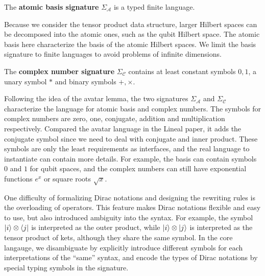 \documentclass[manuscript, review, timestamp]{acmart}
\begin{document}
\begin{definition} 
  The \textbf{atomic basis signature} $\Sigma_\mathcal{A}$ is a  typed finite language.
\end{definition}

Because we consider the tensor product data structure, larger Hilbert spaces can be decomposed into the atomic ones, such as the qubit Hilbert space. The atomic basis here characterize the basis of the atomic Hilbert spaces.
We limit the basis signature to finite languages to avoid problems of infinite dimensions.

\begin{definition} 
  The \textbf{complex number signature} $\Sigma_\mathcal{C}$ contains at least constant symbols $0, 1$, a unary symbol $*$ and binary symbols $+, \times$.
\end{definition}

Following the idea of the avatar lemma, the two signatures $\Sigma_\mathcal{A}$ and $\Sigma_\mathcal{C}$ characterize the language for atomic basis and complex numbers. 
The symbols for complex numbers are zero, one, conjugate, addition and multiplication respectively. Compared the avatar language in the Lineal paper\cite{Arrighi2017}, it adds the conjugate symbol since we need to deal with conjugate and inner product.
These symbols are only the least requirements as interfaces, and the real language to instantiate can contain more details. For example, the basis can contain symbols $0$ and $1$ for qubit spaces, and the complex numbers can still have exponential functions $e^x$ or square roots $\sqrt{x}$.


One difficulty of formalizing Dirac notations and designing the rewriting rules is the overloading of operators. This feature makes Dirac notations flexible and easy to use, but also introduced ambiguity into the syntax. For example, the symbol $\ket{i} \otimes \bra{j}$ is interpreted as the outer product, while $\ket{i} \otimes \ket{j}$ is interpreted as the tensor product of kets, although they share the same symbol. 
In the core langauge, we disambiguate by explicitly introduce different symbols for each interpretations of the ``same'' syntax, and encode the types of Dirac notations by special typing symbols in the signature.
\end{document}
